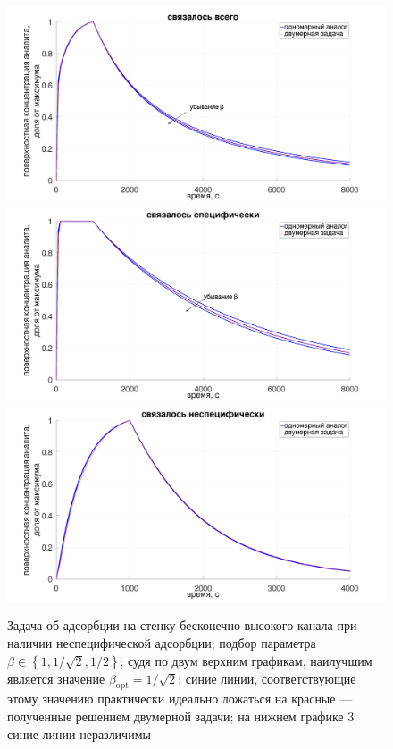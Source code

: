 \documentclass[oneside,final,12pt]{extreport}
\begin{document}
\begin{figure}
  \centering
  \includegraphics[width=.8\textwidth]{pic/flat_wide_twosurf_sum_betas}
  \includegraphics[width=.8\textwidth]{pic/flat_wide_twosurf_a_betas}
  \includegraphics[width=.8\textwidth]{pic/flat_wide_twosurf_b_betas}

  \caption{%
    \label{fig:flat_wide_twosurf_betas}%
    Задача об адсорбции на стенку бесконечно высокого канала
    при наличии неспецифической адсорбции;
    подбор параметра $\beta \in \left\{1,1/\sqrt{2},1/2\right\}$;
    судя по двум верхним графикам, наилучшим является значение
    $\beta_{\text{opt}} = 1/\sqrt{2}$:
    синие линии, соответствующие этому значению практически идеально ложаться
    на красные --- полученные решением двумерной задачи;
    на нижнем графике 3 синие линии неразличимы
  }

\end{figure}
\end{document}
